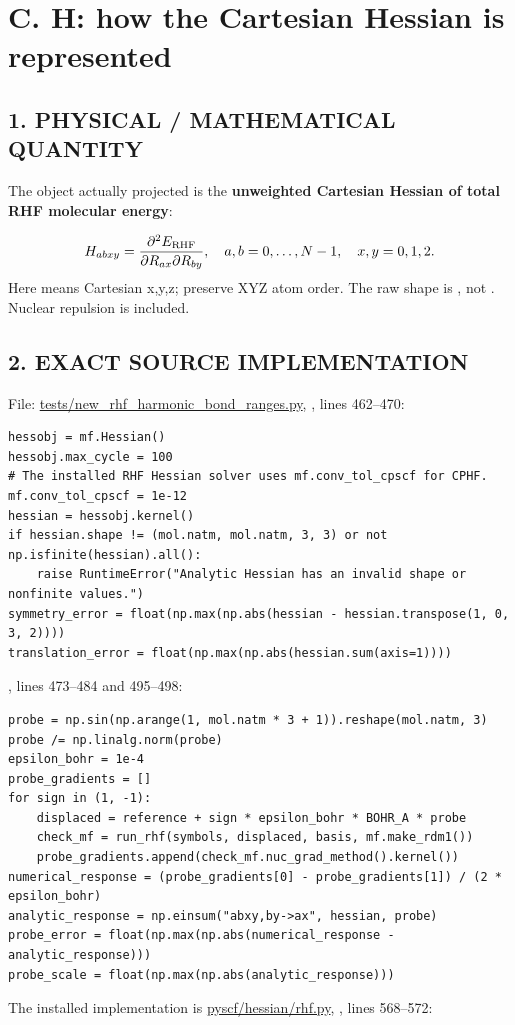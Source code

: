 \documentclass[10pt,a4paper]{article}
\begin{document}
\clearpage
\section{C. H: how the Cartesian Hessian is represented}
\subsection{1. PHYSICAL / MATHEMATICAL QUANTITY}
The object actually projected is the \textbf{unweighted Cartesian Hessian of total RHF molecular energy}:

\[
H_{abxy}=\frac{\partial^2 E_{\rm RHF}}{\partial R_{ax}\partial R_{by}},\quad
a,b=0,\ldots,N-1,\quad x,y=0,1,2.
\]
Here  means Cartesian x,y,z;  preserve XYZ atom order. The raw shape is , not . Nuclear repulsion is included.

\subsection{2. EXACT SOURCE IMPLEMENTATION}
File: \href{/Users/novaz/Desktop/qml2.0/tests/new\_rhf\_harmonic\_bond\_ranges.py:462}{tests/new\_rhf\_harmonic\_bond\_ranges.py}, , lines 462–470:

\begin{Verbatim}
hessobj = mf.Hessian()
hessobj.max_cycle = 100
# The installed RHF Hessian solver uses mf.conv_tol_cpscf for CPHF.
mf.conv_tol_cpscf = 1e-12
hessian = hessobj.kernel()
if hessian.shape != (mol.natm, mol.natm, 3, 3) or not np.isfinite(hessian).all():
    raise RuntimeError("Analytic Hessian has an invalid shape or nonfinite values.")
symmetry_error = float(np.max(np.abs(hessian - hessian.transpose(1, 0, 3, 2))))
translation_error = float(np.max(np.abs(hessian.sum(axis=1))))
\end{Verbatim}
, lines 473–484 and 495–498:

\begin{Verbatim}
probe = np.sin(np.arange(1, mol.natm * 3 + 1)).reshape(mol.natm, 3)
probe /= np.linalg.norm(probe)
epsilon_bohr = 1e-4
probe_gradients = []
for sign in (1, -1):
    displaced = reference + sign * epsilon_bohr * BOHR_A * probe
    check_mf = run_rhf(symbols, displaced, basis, mf.make_rdm1())
    probe_gradients.append(check_mf.nuc_grad_method().kernel())
numerical_response = (probe_gradients[0] - probe_gradients[1]) / (2 * epsilon_bohr)
analytic_response = np.einsum("abxy,by->ax", hessian, probe)
probe_error = float(np.max(np.abs(numerical_response - analytic_response)))
probe_scale = float(np.max(np.abs(analytic_response)))
\end{Verbatim}
The installed implementation is \href{/Users/novaz/Desktop/qml2.0/.venv-rhf/lib/python3.13/site-packages/pyscf/hessian/rhf.py:556}{pyscf/hessian/rhf.py}, , lines 568–572:
\end{document}
